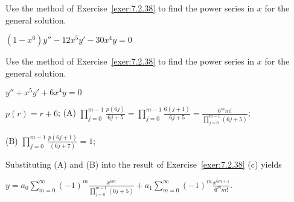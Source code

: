 \documentclass{ximera}
\begin{document}
\begin{problem}\label{exer:7.2.43} 
Use the method of
Exercise~\ref{exer:7.2.38}  to find the power series in $x$
 for the general solution.
 
$(1-x^6)y''-12x^5y'-30x^4y=0$
\end{problem}

\begin{problem}\label{exer:7.2.44} 
Use the method of
Exercise~\ref{exer:7.2.38}  to find the power series in $x$
 for the general solution.
 
 $y''+x^5y'+6x^4y=0$

 \begin{solution}
     $p(r)=r+6$;
(A) $\prod_{j=0}^{m-1}\frac{p(6j)}{6j+5}=
\prod_{j=0}^{m-1}\frac{6(j+1)}{6j+5}=\frac{6^mm!}{\prod_{j=0}^{m-1}
(6j+5)}$;


(B) $\prod_{j=0}^{m-1}\frac{p(6j+1)}{(6j+7)}=1$;

Substituting (A) and (B) into the
result of Exercise~\ref{exer:7.2.38} (c) yields


$y=a_0\sum_{m=0}^\infty(-1)^m\frac{x^{6m}}{\prod_{j=0}^{m-1}(6j+5)}+
a_1\sum_{m=0}^\infty(-1)^m\frac{x^{6m+1}}{6^mm!}$.
 \end{solution}
\end{problem}
\end{document}
